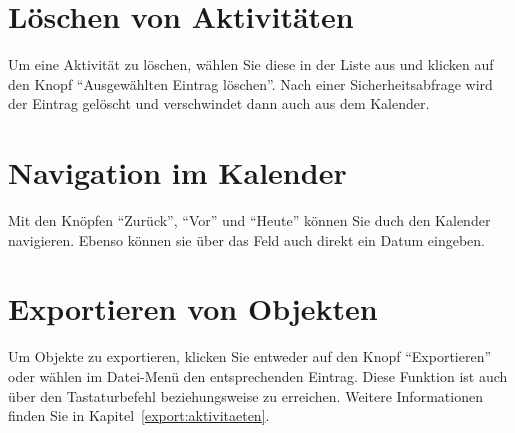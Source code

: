 \section{Löschen von Aktivitäten}\label{kalender:löschen}
Um eine Aktivität zu löschen, wählen Sie diese in der Liste aus und klicken auf den Knopf "`Ausgewählten Eintrag löschen"'.
Nach einer Sicherheitsabfrage wird der Eintrag gelöscht und verschwindet dann auch aus dem Kalender.



\section{Navigation im Kalender}\label{kalender:navigieren}
Mit den Knöpfen "`Zurück"', "`Vor"' und "`Heute"' können Sie duch den Kalender navigieren.
Ebenso können sie über das Feld auch direkt ein Datum eingeben.



\section{Exportieren von Objekten}
Um Objekte zu exportieren, klicken Sie entweder auf den Knopf "`Exportieren"' oder wählen im Datei-Menü den entsprechenden Eintrag.
Diese Funktion ist auch über den Tastaturbefehl  beziehungsweise  zu erreichen.
Weitere Informationen finden Sie in Kapitel~\ref{export:aktivitaeten}.



